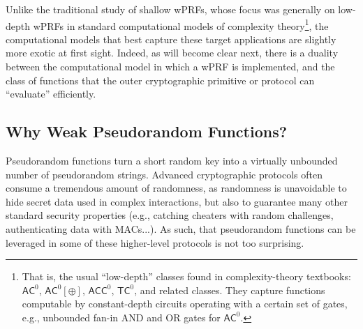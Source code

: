 \documentclass[journal=tosc,submission]{iacrtrans}
\theoremstyle{theorem}
\renewcommand\AC{\ensuremath{\mathsf{AC}}\xspace}
\newcommand\ACC{\ensuremath{\mathsf{ACC}}\xspace}
\renewcommand\TC{\ensuremath{\mathsf{TC}}\xspace}
\newcommand\lp[1]{\textcolor{blue!80}{\textbf{Léo:} #1}}
\newcommand\cb[1]{\textcolor{red!80}{\textbf{Christina:} #1}}
\newcommand\gc[1]{\textcolor{olive!80}{\textbf{Geoffroy:} #1}}
\begin{document}
 Unlike the traditional study of shallow wPRFs, whose focus was generally on low-depth wPRFs in standard computational models of complexity theory\footnote{That is, the usual ``low-depth'' classes found in complexity-theory textbooks: $\AC^0$, $\AC^0[\oplus]$, $\ACC^0$, $\TC^0$, and related classes. They capture functions computable by constant-depth circuits operating with a certain set of gates, e.g., unbounded fan-in AND and OR gates for $\AC^0$.}, 
 the computational models that best capture these target applications are slightly more exotic at first sight. Indeed, as will become clear next, there is a duality between the computational model in which a wPRF is implemented, and the class of functions that the outer cryptographic primitive or protocol can ``evaluate'' efficiently.

\subsection{Why Weak Pseudorandom Functions?}

Pseudorandom functions turn a short random key into a virtually unbounded number of pseudorandom strings. Advanced cryptographic protocols often consume a tremendous amount of randomness, as randomness is unavoidable to hide secret data used in complex interactions, but also to guarantee many other standard security properties (e.g., catching cheaters with random challenges, authenticating data with MACs...). As such, that pseudorandom functions can be leveraged in some of these higher-level protocols is not too surprising.
\end{document}

